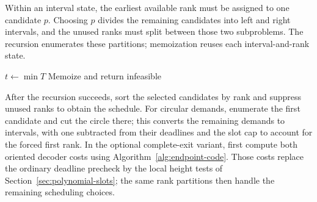 Within an interval state, the earliest available rank must be assigned
to one candidate $p$. Choosing $p$ divides the remaining candidates
into left and right intervals, and the unused ranks must split between
those two subproblems. The recursion enumerates these partitions;
memoization reuses each interval-and-rank state.

\begin{algorithm}[H]
\caption{\SlotDP: exact interval deadlines with a rank subset}
\label{alg:slot-dp}
$t\gets\min T$\;
Memoize and return infeasible\;
\end{algorithm}

After the recursion succeeds, sort the selected candidates by rank and
suppress unused ranks to obtain the schedule. For circular demands,
enumerate the first candidate and cut the circle there; this converts
the remaining demands to intervals, with one subtracted from their
deadlines and the slot cap to account for the forced first rank.
In the optional complete-exit variant, first compute both oriented
decoder costs using Algorithm~\ref{alg:endpoint-code}. Those costs
replace the ordinary deadline precheck by the local height tests of
Section~\ref{sec:polynomial-slots}; the same rank partitions then
handle the remaining scheduling choices.
